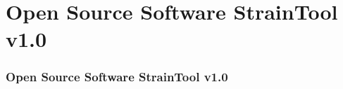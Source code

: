 \section{Open Source Software \textbf{StrainTool v1.0}}
 

\begin{frame}
 \frametitle{Open Source Software \textbf{StrainTool v1.0}}
 \framesubtitle{}
 \label{ch2:straintool}

\end{frame}
\note{}



